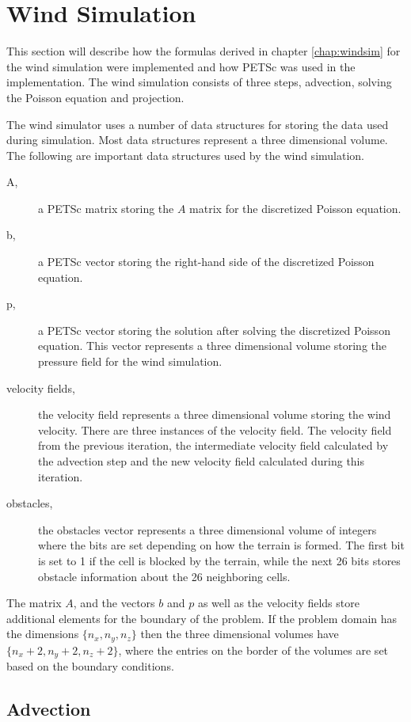 \section{Wind Simulation}

This section will describe how the formulas derived in chapter \ref{chap:windsim}
for the wind simulation were implemented and how PETSc was used in the
implementation. The wind simulation consists of three steps, advection, solving
the Poisson equation and projection. 

The wind simulator uses a number of data structures for storing the data used
during simulation. Most data structures represent a three dimensional volume.
The following are important data structures used by the wind simulation.
\begin{description}
	\item[A,] a PETSc matrix storing the $A$ matrix for the discretized Poisson
		equation.
	\item[b,] a PETSc vector storing the right-hand side of the discretized
		Poisson equation.
	\item[p,] a PETSc vector storing the solution after solving the discretized
		Poisson equation. This vector represents a three dimensional volume
		storing the pressure field for the wind simulation.
	\item[velocity fields,] the velocity field represents a three dimensional
		volume storing the wind velocity. There are three instances of the velocity
		field. The velocity field from the previous iteration, the intermediate
		velocity field calculated by the advection step and the new velocity
		field calculated during this iteration.
	\item[obstacles,] the obstacles vector represents a three dimensional volume
		of integers where the bits are set depending on how the terrain is
		formed. The first bit is set to 1 if the cell is blocked by the terrain,
		while the next 26 bits stores obstacle information about the 26
		neighboring cells.
\end{description}
The matrix $A$, and the vectors $b$ and $p$ as well as the velocity fields store
additional elements for the boundary of the problem. If the problem domain has
the dimensions $\{ n_x, n_y, n_z \}$ then the three dimensional volumes have
$\{ n_x+2, n_y+2, n_z+2 \}$, where the entries on the border of the volumes are
set based on the boundary conditions.

\subsection{Advection}

